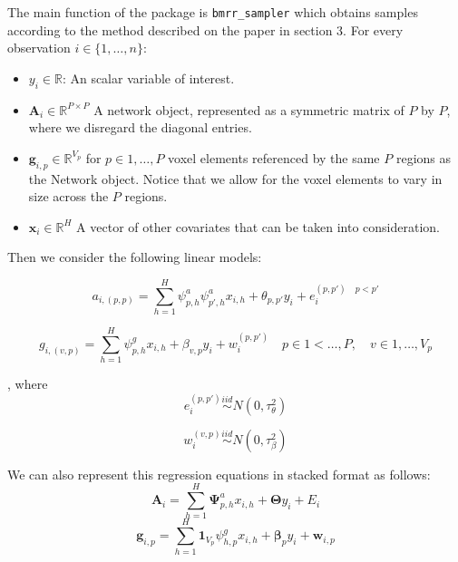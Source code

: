 \documentclass[
]{article}
\providecommand{\tightlist}{%
  \setlength{\itemsep}{0pt}\setlength{\parskip}{0pt}}
\begin{document}
The main function of the package is \texttt{bmrr\_sampler} which obtains samples
according to the method described on the paper in section 3. For every
observation \(i \in \{1,\ldots,n\}\):

\begin{itemize}
\tightlist
\item
  \(y_i          \in \mathbb{R}\): An scalar variable of interest.
\item
  \(\mathbf{A}_i \in \mathbb{R}^{P \times P}\) A network object, represented as
  a symmetric matrix of \(P\) by \(P\), where we disregard the diagonal entries.
\item
  \(\mathbf{g}_{i,p} \in \mathbb{R}^{V_p}\) for \(p \in {1,\ldots,P}\) voxel
  elements referenced by the same \(P\) regions as the Network object. Notice
  that we allow for the voxel elements to vary in size across the \(P\) regions.
\item
  \(\mathbf{x}_i \in \mathbb{R}^H\) A vector of other covariates that can be
  taken into consideration.
\end{itemize}

Then we consider the following linear models:

\begin{equation}
a_{i,(p,p)} = \sum_{h=1}^H \psi^a_{p,h}\psi^a_{p',h} x_{i,h} + \theta_{p,p'}y_i + e_i^{(p,p') \quad p < p'} \label{eq:scalarNetworkEquation}
\end{equation}

\begin{equation}
g_{i,(v,p)} = \sum_{h=1}^H \psi^g_{p,h} x_{i,h} + \beta_{v,p}y_i + w_i^{(p,p')} \quad {p\in{1<\ldots,P}, \quad v\in{1,\ldots,V_p}} 
\label{eq:scalarVoxelEquation}
\end{equation}

, where
\begin{equation}
e_i^{(p,p')} \stackrel{iid}{\sim} N(0, \tau^2_{\theta}) \label{eq:networkNoise}
\end{equation}

\begin{equation}
w_i^{(v,p)} \stackrel{iid}{\sim} N(0, \tau^2_{\beta}) \label{eq:voxelNoise}
\end{equation}

We can also represent this regression equations in stacked format as follows:
\begin{equation}
\mathbf{A}_i = \sum_{h=1}^H \mathbf{\Psi}^a_{p,h} x_{i,h} + \mathbf{\Theta}y_i + E_i \label{eq:stackedNetworkEquation}
\end{equation}
\begin{equation}
\mathbf{g}_{i,p} = \sum_{h=1}^H \mathbf{1}_{V_p} \psi^g_{h,p} x_{i,h} + \mathbf{\beta}_p y_i + \mathbf{w}_{i,p} \label{eq:stackedVoxelEquation}
\end{equation}
\end{document}
